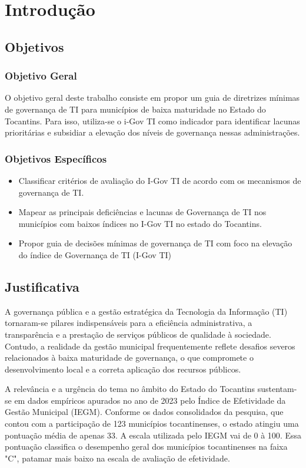 
\mainmatter
\chapter{Introdução}\label{introducao}
\section{Objetivos}
\subsection{Objetivo Geral}
O objetivo geral deste trabalho consiste em propor um guia de diretrizes mínimas de governança de TI 
para municípios de baixa maturidade no Estado do Tocantins. Para isso, utiliza-se o i-Gov TI como 
indicador para identificar lacunas prioritárias e subsidiar a elevação dos níveis de governança 
nessas administrações. 

\subsection{Objetivos Específicos}
\begin{itemize}
  \item Classificar critérios de avaliação do I-Gov TI de acordo com os mecanismos de governança de 
  TI.

  \item Mapear as principais deficiências e lacunas de Governança de TI nos municípios com baixos 
  índices no I-Gov TI no estado do Tocantins.

  \item Propor guia de decisões mínimas de governança de TI  com foco na elevação do índice de 
  Governança de TI (I-Gov TI)
\end{itemize}

\section{Justificativa}
A governança pública e a gestão estratégica da Tecnologia da Informação (TI) tornaram-se pilares 
indispensáveis para a eficiência administrativa, a transparência e a prestação de serviços públicos 
de qualidade à sociedade. Contudo, a realidade da gestão municipal frequentemente reflete desafios 
severos relacionados à baixa maturidade de governança, o que compromete o desenvolvimento local e a 
correta aplicação dos recursos públicos.

A relevância e a urgência do tema no âmbito do Estado do Tocantins sustentam-se em dados empíricos 
apurados no ano de 2023 pelo Índice de Efetividade da Gestão Municipal (IEGM). Conforme os dados 
consolidados da pesquisa, que contou com a participação de 123 municípios tocantinenses, o estado 
atingiu uma pontuação média de apenas 33. A escala utilizada pelo IEGM vai de 0 à 100\cite{lima_influencia_2023}. 
Essa pontuação classifica o desempenho geral dos municípios tocantinenses na faixa "C", patamar mais 
baixo na escala de avaliação de efetividade.

